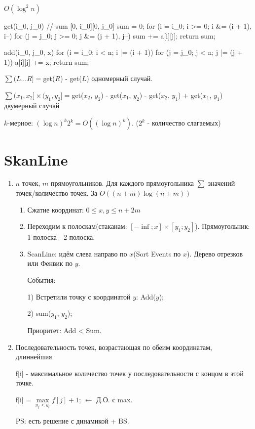 $O(\log^2 n)$

\begin{cppcode}
	get(i_0, j_0) { // sum [0, i_0][0, j_0]
		sum = 0;
		for (i = i_0; i >= 0; i &= (i + 1), i--)
			for (j = j_0; j >= 0; j &= (j + 1), j--)
				sum += a[i][j];
		return sum;
   }
\end{cppcode}

\begin{cppcode}
	add(i_0, j_0, x) { 
		for (i = i_0; i < n; i |= (i + 1))
			for (j = j_0; j < n; j |= (j + 1))
				a[i][j] += x;
		return sum;
   }
\end{cppcode}

$\sum(L \dots R] = $get($R$) - get($L$) одномерный случай.

$\sum(x_1, x_2]\times(y_1, y_2] = $get($x_2$, $y_2$) - get($x_1$, $y_2$) - get($x_2$, $y_1$) + get($x_1$, $y_1$) двумерный случай

$k$-мерное: $(\log n)^k2^k = O((\log n)^k)$. ($2^k$ - количество слагаемых)

\section{SkanLine}

\begin{enumerate}
	\item $n$ точек, $m$ прямоугольников. Для каждого прямоугольника  $\sum$ значений точек/количество точек. За $O((n + m)\log(n + m))$
	\begin{enumerate}
		\item Сжатие координат: $0 \le x, y \le n + 2m$
		\item Переходим к полоскам(стаканам: $[-\inf; x]\times[y_1; y_2]$). Прямоугольник: 1 полоска - 2 полоска.
		\item ScanLine: идём слева направо по $x$(Sort Events по $x$). Дерево отрезков или Фенвик по $y$.

		События:

		1) Встретили точку с координатой $y$: Add($y$);

		2) sum($y_1$, $y_2$);

		Приоритет: Add < Sum.
	\end{enumerate}
	\item Последовательность точек, возрастающая по обеим координатам, длиннейшая.

	f[i] - максимальное количество точек у последовательности с концом в этой точке.

	f[i] = $\max\limits_{y_j < y_i} f[j] + 1$; $\leftarrow$ Д.О. с max.

	PS: есть решение с динамикой + BS.
\end{enumerate}
